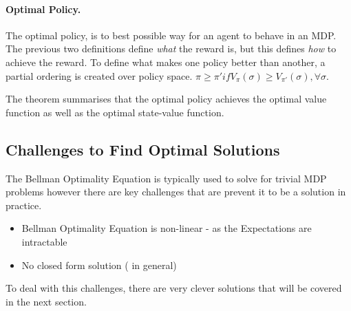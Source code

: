 \documentclass[ %
                    author={Ashwinder Khurana},
                supervisor={Prof Dave Cliff},
                    degree={MEng},
                     title={The Deeply Reinforced Trader},
                  subtitle={},
                      type={enterprise},
                      year={2020} ]{dissertation}
\begin{document}
{\paragraph{Optimal Policy.} The optimal policy, is to best possible way for an agent to behave in an MDP. The previous two definitions define \textit{what} the reward is, but this defines \textit{how} to achieve the reward. To define what makes one policy better than another, a partial ordering is created over policy space. $\pi \geq \pi'  if  V_\pi(\sigma) \geq V_{\pi'}(\sigma), \forall \sigma$. 

The theorem \cite{MDP-theorem RL Course by David Silver - Lecture 2: Markov Decision Process} summarises that the optimal policy achieves the optimal value function as well as the optimal state-value function. 

\subsection{Challenges to Find Optimal Solutions}
The Bellman Optimality Equation is typically used to solve for trivial MDP problems however there are key challenges that are prevent it to be a solution in practice. 

\begin{itemize}
\item Bellman Optimality Equation is non-linear - as the Expectations are intractable 
\item No closed form solution ( in general)
\end{itemize}

\noindent
To deal with this challenges, there are very clever solutions that will be covered in the next section.

}
\end{document}
